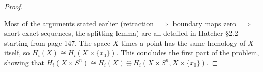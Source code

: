 \begin{proof}
\begin{figure}[H]
\centering
{}
\end{figure}
Most of the arguments stated earlier (retraction $\implies $ boundary maps zero $\implies $ short exact sequences, the splitting lemma) are all detailed in Hatcher \S 2.2 starting from page 147. The space $X$ times a point has the same homology of $X$ itself, so $H_i (X)\cong H_i (X \times \{x_0\} )$. This concludes the first part of the problem, showing that $H_i (X\times S^n )\cong H_i (X)\oplus H_i (X\times S^n , X\times \{x_0\} )$.


\end{proof}
